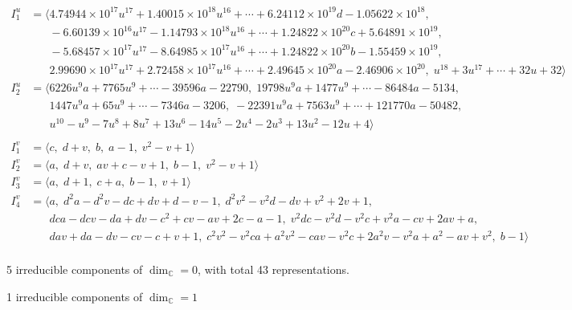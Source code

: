 \documentclass[1p]{elsarticle_modified}
\theoremstyle{definition}
\begin{document}
\begin{align*}
I^u_{1}&=\langle 
4.74944\times10^{17} u^{17}+1.40015\times10^{18} u^{16}+\cdots+6.24112\times10^{19} d-1.05622\times10^{18},\\
\phantom{I^u_{1}}&\phantom{= \langle  }-6.60139\times10^{16} u^{17}-1.14793\times10^{18} u^{16}+\cdots+1.24822\times10^{20} c+5.64891\times10^{19},\\
\phantom{I^u_{1}}&\phantom{= \langle  }-5.68457\times10^{17} u^{17}-8.64985\times10^{17} u^{16}+\cdots+1.24822\times10^{20} b-1.55459\times10^{19},\\
\phantom{I^u_{1}}&\phantom{= \langle  }2.99690\times10^{17} u^{17}+2.72458\times10^{17} u^{16}+\cdots+2.49645\times10^{20} a-2.46906\times10^{20},\;u^{18}+3 u^{17}+\cdots+32 u+32\rangle \\
I^u_{2}&=\langle 
6226 u^9 a+7765 u^9+\cdots-39596 a-22790,\;19798 u^9 a+1477 u^9+\cdots-86484 a-5134,\\
\phantom{I^u_{2}}&\phantom{= \langle  }1447 u^9 a+65 u^9+\cdots-7346 a-3206,\;-22391 u^9 a+7563 u^9+\cdots+121770 a-50482,\\
\phantom{I^u_{2}}&\phantom{= \langle  }u^{10}- u^9-7 u^8+8 u^7+13 u^6-14 u^5-2 u^4-2 u^3+13 u^2-12 u+4\rangle \\
\\
I^v_{1}&=\langle 
c,\;d+v,\;b,\;a-1,\;v^2- v+1\rangle \\
I^v_{2}&=\langle 
a,\;d+v,\;a v+c- v+1,\;b-1,\;v^2- v+1\rangle \\
I^v_{3}&=\langle 
a,\;d+1,\;c+a,\;b-1,\;v+1\rangle \\
I^v_{4}&=\langle 
a,\;d^2 a- d^2 v- d c+d v+d- v-1,\;d^2 v^2- v^2 d- d v+v^2+2 v+1,\\
\phantom{I^v_{4}}&\phantom{= \langle  }d c a- d c v- d a+d v- c^2+c v- a v+2 c- a-1,\;v^2 d c- v^2 d- v^2 c+v^2 a- c v+2 a v+a,\\
\phantom{I^v_{4}}&\phantom{= \langle  }d a v+d a- d v- c v- c+v+1,\;c^2 v^2- v^2 c a+a^2 v^2- c a v- v^2 c+2 a^2 v- v^2 a+a^2- a v+v^2,\;b-1\rangle \\
\end{align*}
\raggedright * 5 irreducible components of $\dim_{\mathbb{C}}=0$, with total 43 representations.\\
\raggedright * 1 irreducible components of $\dim_{\mathbb{C}}=1$ \\
\newpage
\renewcommand{\arraystretch}{1}
\end{document}
